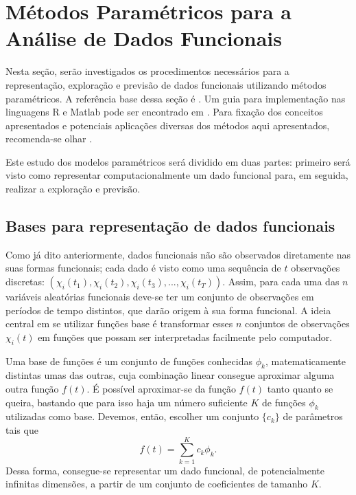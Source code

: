 \documentclass[
	12pt,				%
	openright,			%
	oneside,			%
	a4paper,			%
	english,			%
	brazil				%
	]{dissertacao-ufrgs-abntex2}
\begin{document}
\section{Métodos Paramétricos para a Análise de Dados Funcionais\label{sec:Metodologias-para-modelos}}

Nesta seção, serão investigados os procedimentos necessários para
a representação, exploração e previsão de dados funcionais utilizando
métodos paramétricos. A referência base dessa seção é .
Um guia para implementação nas linguagens R e Matlab pode ser encontrado
em . Para fixação dos conceitos apresentados e potenciais
aplicações diversas dos métodos aqui apresentados, recomenda-se olhar
. 

Este estudo dos modelos paramétricos será dividido em duas partes:
primeiro será visto como representar computacionalmente um dado funcional
para, em seguida, realizar a exploração e previsão.


\subsection{Bases para representação
de dados funcionais} %

Como já dito anteriormente, dados funcionais não são observados
diretamente nas suas formas funcionais; cada dado é visto como uma
sequência de $t$ observações discretas: $(\chi_{i}(t_{1}),\chi_{i}(t_{2}),\chi_{i}(t_{3}),...,\chi_{i}(t_{T}))$.
Assim, para cada uma das $n$ variáveis aleatórias funcionais deve-se
ter um conjunto de observações em períodos de tempo distintos, que
darão origem à sua forma funcional. A ideia central em se utilizar
funções base é transformar esses $n$ conjuntos de observações $\chi_{i}(t)$
em funções que possam ser interpretadas facilmente pelo computador.

Uma base de funções é um conjunto de funções conhecidas $\phi_{k}$,
matematicamente distintas umas das outras, cuja combinação linear
consegue aproximar alguma outra função $f(t)$. É possível aproximar-se da função $f(t)$ tanto quanto se queira, bastando que
para isso haja um número suficiente $K$ de funções $\phi_{k}$ utilizadas 
como base. Devemos, então, escolher um conjunto $\{c_{k}\}$ de parâmetros tais que
\begin{equation}
f(t)=\sum_{k=1}^{K}c_{k}\phi_{k}.
\end{equation}
Dessa forma, consegue-se representar um dado funcional, de potencialmente
infinitas dimensões, a partir de um conjunto de coeficientes de tamanho
$K$. 
\end{document}
